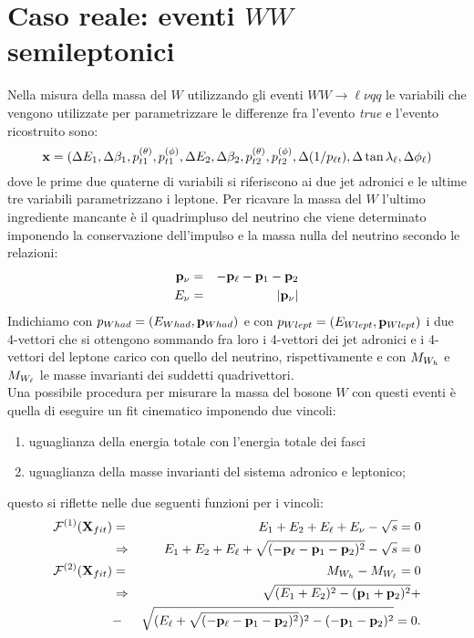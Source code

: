 \section{Caso reale: eventi $WW$ semileptonici}
%
Nella misura della massa del $W$ utilizzando gli eventi $WW\to{\ell\nu}qq$
le variabili che vengono utilizzate per parametrizzare le differenze fra l'evento
{\em true} e l'evento ricostruito sono:
\begin{equation}
\label{paramx}
{\bf x}=(\Delta E_1,\Delta\beta_1,{p^{(\theta)}_{t1}},{p^{(\phi)}_{t1}},\Delta E_2,\Delta\beta_2,{p^{(\theta)}_{t2}},{p^{(\phi)}_{t2}},\Delta(1/p_{\ell t}),\Delta\tan\lambda_\ell,\Delta\phi_\ell)
\end{equation}
dove le prime due quaterne di variabili si riferiscono ai due jet adronici e le ultime tre variabili parametrizzano i leptone. Per ricavare la massa del $W$ l'ultimo ingrediente mancante \`e il quadrimpluso del neutrino che viene determinato
imponendo la conservazione dell'impulso e la massa nulla del neutrino secondo le
relazioni:
\begin{eqnarray}
\label{fourneu}
{\bf p}_\nu&=&-{\bf p}_\ell-{\bf p}_1-{\bf p}_2\nonumber\\
E_\nu&=&|{\bf p}_\nu|
\end{eqnarray}
Indichiamo con $p_{Whad}=(E_{Whad},{\bf p}_{Whad})$ e con $p_{Wlept}=(E_{Wlept},{\bf p}_{Wlept})$ i due 4-vettori che si ottengono sommando fra loro i 4-vettori dei jet adronici e i 4-vettori del leptone carico con quello del
neutrino, rispettivamente e con $M_{W_h}$ e $M_{W_\ell}$ le masse invarianti
dei suddetti quadrivettori.\\
Una possibile procedura per misurare la massa del bosone $W$ con questi eventi \`e quella di eseguire un fit cinematico imponendo due vincoli:
\begin{enumerate}
\item uguaglianza della energia totale con l'energia totale dei fasci
\item uguaglianza della masse invarianti del sistema adronico e leptonico;
\end{enumerate}
questo si riflette nelle due seguenti funzioni per i vincoli:
\begin{eqnarray}
\label{vinc1}
{\cal F}^{(1)}({\bf X}_{fit})&=&E_1+E_2+E_\ell+E_\nu-\sqrt{s}=0\nonumber\\&\Rightarrow&E_1+E_2+E_\ell+\sqrt{(-{\bf p}_\ell-{\bf p}_1-{\bf p}_2)^2}-\sqrt{s}=0\\
{\cal F}^{(2)}({\bf X}_{fit})&=&M_{W_h}-M_{W_\ell}=0\nonumber\\&\Rightarrow&\sqrt{(E_1+E_2)^2-({\bf p}_1+{\bf p}_2)^2}+\nonumber\\
\label{vinc2}&-&\sqrt{(E_\ell+\sqrt{(-{\bf p}_\ell-{\bf p}_1-{\bf p}_2)^2})^2-(-{\bf p}_1-{\bf p}_2)^2}=0.
\end{eqnarray}
